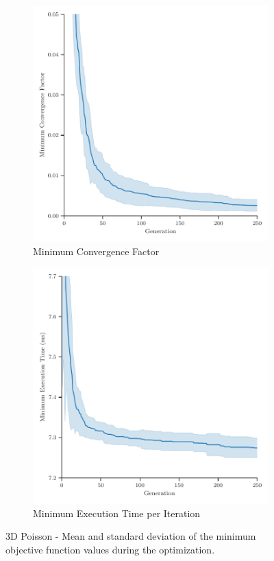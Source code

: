 \begin{figure}
	\centering
	\begin{subfigure}[b]{0.49\textwidth}
		\centering
		\includegraphics[width=\textwidth]{figures/minimum_convergence_factor_3D_FD_Poisson_fromL2.pdf}
		\caption{Minimum Convergence Factor}
		\label{fig:poisson-3D-minimum-convergence-factor}
	\end{subfigure}
	\hfill
	\begin{subfigure}[b]{0.49\textwidth}
		\centering
		\includegraphics[width=\textwidth]{figures/minimum_execution_time_3D_FD_Poisson_fromL2.pdf}
		\caption{Minimum Execution Time per Iteration}
		\label{fig:poisson-3D-minimum-execution-time}
	\end{subfigure}
	\caption{3D Poisson - Mean and standard deviation of the minimum objective function values during the optimization.}
	\label{fig:poisson-3D-minimum-objectives}
\end{figure}
